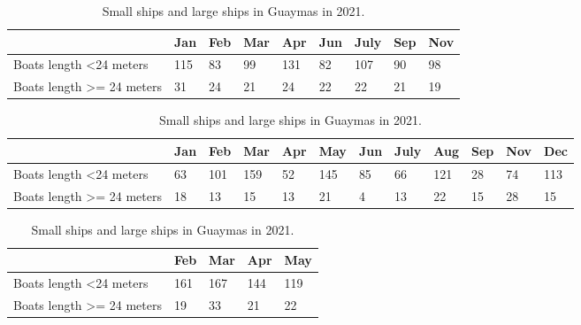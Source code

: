 \begin{table}[h!]
\begin{tabular}{|l|l|l|l|l|l|l|l|l|}
\hline
                                       & Jan & Feb & Mar & Apr & Jun & July & Sep & Nov \\ \hline
Boats length \textless 24 meters       & 115 & 83  & 99  & 131 & 82  & 107  & 90  & 98  \\ \hline
Boats length \textgreater{}= 24 meters & 31  & 24  & 21  & 24  & 22  & 22   & 21  & 19  \\ \hline
\end{tabular}
\caption{Small ships and large ships in Guaymas in 2019.}
\label{table:4.1}



\begin{tabular}{|p{2.4cm}|l|l|l|l|l|l|l|l|l|l|l|}
\hline
                                       & Jan & Feb & Mar & Apr & May & Jun & July & Aug & Sep & Nov & Dec \\ \hline
Boats length \textless 24 meters       & 63  & 101 & 159 & 52  & 145 & 85  & 66   & 121 & 28  & 74  & 113 \\ \hline
Boats length \textgreater{}= 24 meters & 18  & 13  & 15  & 13  & 21  & 4   & 13   & 22  & 15  & 28  & 15  \\ \hline
\end{tabular}
\caption{Small ships and large ships in Guaymas in 2020.}



\begin{tabular}{|l|l|l|l|l|}
\hline
                                       & Feb & Mar & Apr & May \\ \hline
Boats length \textless 24 meters       & 161 & 167 & 144 & 119 \\ \hline
Boats length \textgreater{}= 24 meters & 19  & 33  & 21  & 22  \\ \hline
\end{tabular}
\caption{Small ships and large ships in Guaymas in 2021.}
\end{table}


